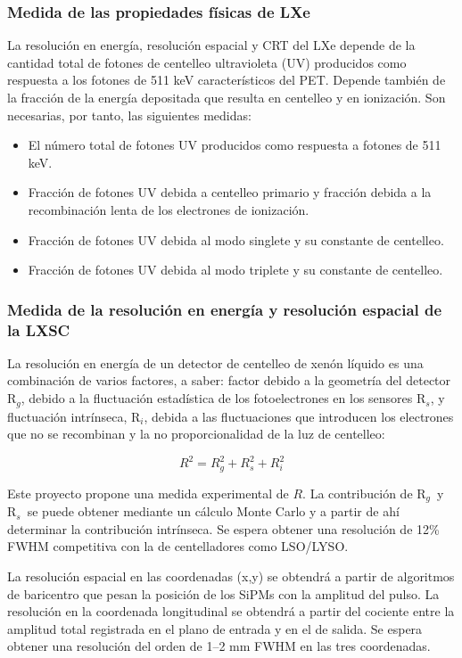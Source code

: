 \subsubsection*{Medida de las propiedades físicas de LXe}
La resolución en energía, resolución espacial y CRT del LXe depende de la cantidad total de fotones de centelleo ultravioleta (UV) producidos como respuesta a los fotones de 511 keV característicos del PET. Depende también de la fracción de la energía depositada que resulta en centelleo y en ionización. Son necesarias, por tanto, las siguientes medidas:
\begin{itemize}
\item El número total de fotones UV producidos como respuesta a fotones de 511 keV. 
\item Fracción de fotones UV debida a centelleo primario y fracción debida a la recombinación lenta de los electrones de ionización. 
\item Fracción de fotones UV debida al modo singlete y su constante de centelleo.
\item Fracción de fotones UV debida al modo triplete y su constante de centelleo. 
\end{itemize}

\subsubsection*{Medida de la resolución en energía y resolución espacial de la LXSC}

La resolución en energía de un detector de centelleo de xenón líquido es una combinación de varios factores, a saber: factor debido a la geometría del detector R$_g$, debido a la fluctuación estadística de los fotoelectrones en los sensores R$_s$, y fluctuación intrínseca, R$_i$, debida a las fluctuaciones que introducen los electrones que no se recombinan y la no proporcionalidad de la luz de centelleo:

\begin{equation}
R^2 = R_g^2 + R_s^2 +  R_i^2
\end{equation}

Este proyecto propone una medida experimental de $R$. La contribución de 
R$_g$~y R$_s$~se puede obtener mediante un cálculo Monte Carlo y a partir de ahí determinar la contribución intrínseca. Se espera obtener una resolución de 12\% FWHM competitiva con la de centelladores como LSO/LYSO. 

La resolución espacial en las coordenadas (x,y) se obtendrá a partir de algoritmos de baricentro que pesan la posición de los SiPMs con la amplitud del pulso. La resolución en la coordenada longitudinal se obtendrá a partir del cociente entre la amplitud total registrada en el plano de entrada y en el de salida. Se espera obtener una resolución del orden de 1--2 mm FWHM en las tres coordenadas.     

